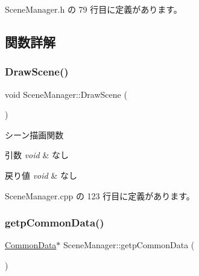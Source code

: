  Scene\+Manager.\+h の 79 行目に定義があります。



\subsection{関数詳解}
\mbox{\label{class_scene_manager_a828b35826f757b8af34aa767c6b40378}} 
\subsubsection{\texorpdfstring{Draw\+Scene()}{DrawScene()}}
{\footnotesize\ttfamily void Scene\+Manager\+::\+Draw\+Scene (\begin{DoxyParamCaption}{ }\end{DoxyParamCaption})}



シーン描画関数 


\begin{DoxyParams}{引数}
{\em void} & なし \\
\hline
\end{DoxyParams}

\begin{DoxyRetVals}{戻り値}
{\em void} & なし \\
\hline
\end{DoxyRetVals}


 Scene\+Manager.\+cpp の 123 行目に定義があります。

\mbox{\label{class_scene_manager_a53145632c87301427f9cedc3345d2557}} 
\subsubsection{\texorpdfstring{getp\+Common\+Data()}{getpCommonData()}}
{\footnotesize\ttfamily \mbox{\hyperlink{class_scene_manager_1_1_common_data}{Common\+Data}}$\ast$ Scene\+Manager\+::getp\+Common\+Data (\begin{DoxyParamCaption}{ }\end{DoxyParamCaption})\hspace{0.3cm}{\ttfamily [inline]}}




